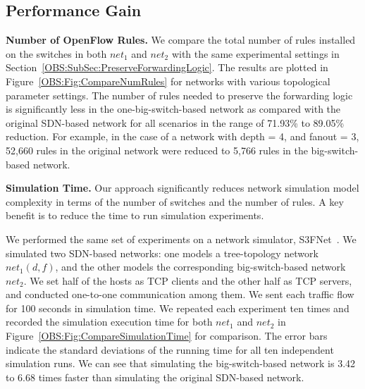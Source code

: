 \subsection{Performance Gain}

\textbf{Number of OpenFlow Rules.} We compare the total number of rules installed
on the switches in both $net_1$ and $net_2$ with the same experimental settings
in Section~\ref{OBS:SubSec:PreserveForwardingLogic}.
The results are plotted in Figure~\ref{OBS:Fig:CompareNumRules} for networks with
various topological parameter settings.
The number of rules needed to preserve the forwarding logic is significantly
less in the one-big-switch-based network as compared with the original SDN-based network
for all scenarios in the range of 71.93\% to 89.05\% reduction.
For example, in the case of a network with depth = 4, and fanout = 3, 52,660 rules
in the original network were reduced to 5,766 rules in the big-switch-based network.


\textbf{Simulation Time.}
Our approach significantly reduces network simulation model complexity in terms of
the number of switches and the number of rules.
A key benefit is to reduce the time to run simulation experiments.

We performed the same set of experiments on a network simulator, S3FNet~\cite{S3F}.
We simulated two SDN-based networks: one models a tree-topology network $net_1(d, f)$,
and the other models the corresponding big-switch-based network $net_2$.
We set half of the hosts as TCP clients and the other half as TCP servers,
and conducted one-to-one communication among them.
We sent each traffic flow for 100 seconds in simulation time.
We repeated each experiment ten times and recorded the simulation execution time for both $net_1$ and $net_2$ in
Figure~\ref{OBS:Fig:CompareSimulationTime} for comparison.
The error bars indicate the standard deviations of the running time
for all ten independent simulation runs.
We can see that simulating the big-switch-based network is 3.42 to 6.68 times
faster than simulating the original SDN-based network.


